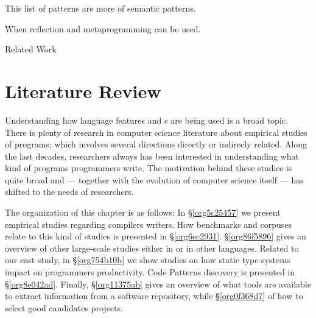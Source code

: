 \documentclass{usiinfdocprop}
\begin{document}
This list of patterns are more of semantic patterns.

When reflection and metaprogramming can be used.

Related Work

\chapter{Literature Review \label{org53ba504}}
\label{sec:org8b0bad6}
Understanding how language features and \api{}s are being used is a broad topic.
There is plenty of research in computer science literature about empirical studies of programs; which involves several directions directly or indirecly related.
Along the last decades, researchers always has been interested in understanding what kind of programs programmers write.
The motivation behind these studies is quite broad and --- together with the evolution of computer science itself --- has shifted to the needs of researchers.

The organization of this chapter is as follows:
In \S\ref{org5c25457} we present empirical studies regarding compilers writers.
How benchmarks and corpuses relate to this kind of studies is presented in \S\ref{org6ec2931}.
\S\ref{org86f5896} gives an overview of other large-scale studies either in \java{} or in other languages.
Related to our cast study, in \S\ref{org754b10b} we show studies on how static type systems impact on programmers productivity.
Code Patterns discovery is presented in \S\ref{org8e042ad}.
Finally, \S\ref{org11375ab} gives an overview of what tools are available to extract information from a software repository, while \S\ref{org0f368d7} of how to select good candidates projects.

\cite{meyerovich_empirical_2013}
\end{document}
